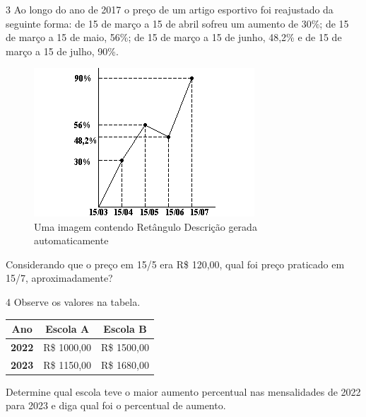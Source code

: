 \begin{escolha}
{{\num{3} Ao longo do ano de 2017 o preço de um artigo esportivo foi
reajustado da seguinte forma: de 15 de março a 15 de abril sofreu um
aumento de 30\%; de 15 de março a 15 de maio, 56\%; de 15 de março a 15
de junho, 48,2\% e de 15 de março a 15 de julho, 90\%.

\begin{figure}
\centering
\includegraphics[width=3.25in,height=2.18333in]{./_SAEB_9_MAT/media/image58.png}
\caption{Uma imagem contendo Retângulo Descrição gerada automaticamente}
\end{figure}

Considerando que o preço em 15/5 era R\$ 120,00, qual foi preço praticado
em 15/7, aproximadamente?


\num{4} Observe os valores na tabela. 

\begin{table}[]
\begin{tabular}{|lll|}
\hline
\multicolumn{1}{|c}{\textbf{Ano}} & \multicolumn{1}{c}{\textbf{Escola A}} & \multicolumn{1}{c|}{\textbf{Escola B}} \\ \hline
\textbf{2022} & R\$ 1000,00 & R\$ 1500,00 \\ \hline
\textbf{2023} & R\$ 1150,00 & R\$ 1680,00 \\ \hline
\end{tabular}
\end{table}

Determine qual escola teve o maior aumento percentual nas mensalidades
de 2022 para 2023 e diga qual foi o percentual de aumento.

}}
\end{escolha}
